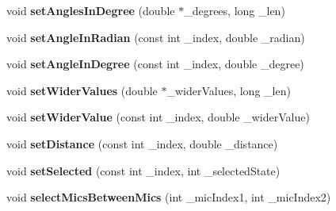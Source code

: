 \begin{DoxyCompactItemize}
\item 
\hypertarget{class_ambisonic_virtual_mic_u_i_manager_a9fc82893a69092e5938fc7309c52fa84}{void {\bfseries set\-Angles\-In\-Degree} (double $\ast$\-\_\-degrees, long \-\_\-len)}\label{class_ambisonic_virtual_mic_u_i_manager_a9fc82893a69092e5938fc7309c52fa84}

\item 
\hypertarget{class_ambisonic_virtual_mic_u_i_manager_ac6a880e84ed9b70f4569c3f3723c713a}{void {\bfseries set\-Angle\-In\-Radian} (const int \-\_\-index, double \-\_\-radian)}\label{class_ambisonic_virtual_mic_u_i_manager_ac6a880e84ed9b70f4569c3f3723c713a}

\item 
\hypertarget{class_ambisonic_virtual_mic_u_i_manager_ad898afa1293d260e361a45f609d6956f}{void {\bfseries set\-Angle\-In\-Degree} (const int \-\_\-index, double \-\_\-degree)}\label{class_ambisonic_virtual_mic_u_i_manager_ad898afa1293d260e361a45f609d6956f}

\item 
\hypertarget{class_ambisonic_virtual_mic_u_i_manager_a45c963e49787c9dd21591fdbc0a557a1}{void {\bfseries set\-Wider\-Values} (double $\ast$\-\_\-wider\-Values, long \-\_\-len)}\label{class_ambisonic_virtual_mic_u_i_manager_a45c963e49787c9dd21591fdbc0a557a1}

\item 
\hypertarget{class_ambisonic_virtual_mic_u_i_manager_a3177657e68c8113813f6810e5850361e}{void {\bfseries set\-Wider\-Value} (const int \-\_\-index, double \-\_\-wider\-Value)}\label{class_ambisonic_virtual_mic_u_i_manager_a3177657e68c8113813f6810e5850361e}

\item 
\hypertarget{class_ambisonic_virtual_mic_u_i_manager_afa96f5397c623a4d106ae551a0207db8}{void {\bfseries set\-Distance} (const int \-\_\-index, double \-\_\-distance)}\label{class_ambisonic_virtual_mic_u_i_manager_afa96f5397c623a4d106ae551a0207db8}

\item 
\hypertarget{class_ambisonic_virtual_mic_u_i_manager_a134038b71c64b92e33ffba1924464d6a}{void {\bfseries set\-Selected} (const int \-\_\-index, int \-\_\-selected\-State)}\label{class_ambisonic_virtual_mic_u_i_manager_a134038b71c64b92e33ffba1924464d6a}

\item 
\hypertarget{class_ambisonic_virtual_mic_u_i_manager_a07735e678c161488f38368ea32fc32f5}{void {\bfseries select\-Mics\-Between\-Mics} (int \-\_\-mic\-Index1, int \-\_\-mic\-Index2)}\label{class_ambisonic_virtual_mic_u_i_manager_a07735e678c161488f38368ea32fc32f5}


\end{DoxyCompactItemize}
